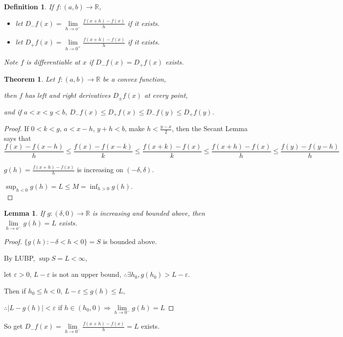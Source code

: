 \documentclass[12pt]{article}
\newcommand{\abs}[1]{\left| #1 \right|}
\theoremstyle{plain}
\newtheorem{theorem}{Theorem}[subsection]
\newtheorem{definition}{Definition}[subsection]
\newtheorem{lemma}{Lemma}[subsection]
\newcommand{\ep}{\varepsilon}
\newcommand{\dlim}{\displaystyle\lim\limits}
\begin{document}
		\begin{definition}
			If $f:(a,b)\to\mathbb{R}$,
			\begin{itemize}
				\item let $D_-f(x) = \dlim_{h\to o^-} \frac{f(x+h)-f(x)}h$
					if it exists.
				\item let $D_+f(x) = \dlim_{h\to 0^+} \frac{f(x+h)-f(x)}h$
					if it exists.
				\end{itemize}
				Note $f$ is differentiable at $x$ if $D_-f(x)=D_+f(x)$ exists.\\
		\end{definition}

		\begin{theorem}
			Let $f:(a,b)\to\mathbb{R}$ be a convex function, 

			then $f$ has left and right derivatives $D_{\pm}f(x)$ at every point,
			
			and if $a < x < y < b$, $D_-f(x)\leq D_+f(x)\leq D_-f(y)\leq D_+f(y)$.
		\end{theorem}
		\begin{proof}
			If $0<k<g$, $a<x-h$, $y+h<b$, make $h<\frac{y-x}2$, 
			then the Secant Lemma says that 
			\[\frac{f(x)-f(x-h)}h \leq \frac{f(x)-f(x-k)}k 
			\leq \frac{f(x+k)-f(x)}k \leq \frac{f(x+h)-f(x)}h 
			\leq \frac{f(y)-f(y-h)}h\]

			$g(h) = \frac{f(x+h)-f(x)}h$ is increasing on $(-\delta, \delta)$.

			$\sup _{h<0} g(h) = L \leq M = \inf _{h>0}g(h)$.\\
		\end{proof}

		\begin{lemma}
			If $g:(\delta, 0) \to \mathbb{R}$ is increasing and bounded above,
			then $\dlim_{h\to o^-} g(h) = L$ exists.
		\end{lemma}
		\begin{proof}
			$\{g(h): -\delta < h < 0\} = S$ is bounded above.

			By LUBP, $\sup S = L < \infty$, 

		  let $\ep > 0$, $L -\ep$ is not an upper bound, 
		  $\therefore \exists h_0, g(h_0)> L-\ep$. 

		  Then if $ h_ 0\leq h < 0$, $L -\ep\leq g(h)\leq L $,

		  $\therefore \abs{L-g(h)}<\ep$ if $h \in (h_0, 0) \Rightarrow 
		  \dlim_{h\to 0^-} g(h) = L$ 
		\end{proof}

		So get $D_-f(x) = \dlim_{h\to 0^-}\frac{f(x+h) - f(x)}{h} = L$ exists.  
		
\end{document}
